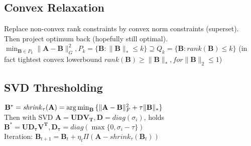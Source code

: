 \subsection*{Convex Relaxation}
Replace non-convex rank constraints by convex norm constraints (superset). Then project optimum back (hopefully still optimal).\\
$\min_{\mathbf{B}\in P_k}{\|\mathbf{A-B}\|^2_G}, P_k=\{\mathbf{B}:\|\mathbf{B}\|_{*}\leq k\}\supseteq Q_k=\{\mathbf{B}:\mathit{rank}(\mathbf{B})\leq k\}$ (in fact tightest convex lowerbound $\mathit{rank}(\mathbf{B})\geq \|\mathbf{B}\|_{*}, for \|\mathbf{B}\|_2 \leq 1$)

\subsection*{SVD Thresholding}
$\mathbf{B}^{*}=\mathit{shrink}_\tau(\mathbf{A})=\operatorname*{arg\,min}_{\mathbf{B}}{\{\|\mathbf{A-B}\|^2_F + \tau\|\mathbf{B}\|_{*}\}}$\\
Then with SVD $\mathbf{A=UDV_T}, \mathbf{D}=\mathit{diag}(\sigma_i)$, holds $\mathbf{B^*=UD_\tau V^T, D_\tau} = \mathit{diag}(\max\{0,\sigma_i - \tau\})$ \\
Iteration: $\mathbf{B}_{t+1}=\mathbf{B}_t + \eta_t \Pi(\mathbf{A} - \mathit{shrink}_\tau(\mathbf{B}_t))$